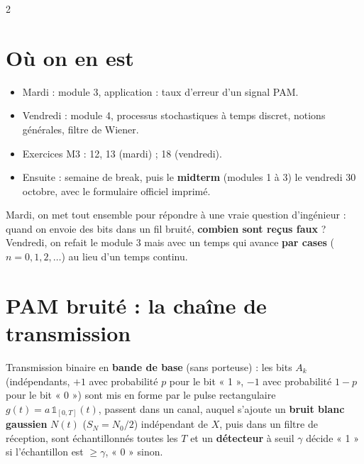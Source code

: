 \documentclass[a4paper,9pt]{extarticle}
\begin{document}

\thispagestyle{fancy}



\begin{multicols}{2}


\section{Où on en est}


\begin{summary}

\begin{itemize}

\item Mardi : module 3, application : taux d'erreur d'un signal PAM.

\item Vendredi : module 4, processus stochastiques à temps discret, notions générales, filtre
de Wiener.

\item Exercices M3 : 12, 13 (mardi) ; 18 (vendredi).

\item Ensuite : semaine de break, puis le \textbf{midterm} (modules 1 à 3) le vendredi 30
octobre, avec le formulaire officiel imprimé.

\end{itemize}

\end{summary}


\begin{simple}

Mardi, on met tout ensemble pour répondre à une vraie question d'ingénieur : quand on envoie
des bits dans un fil bruité, \textbf{combien sont reçus faux} ? Vendredi, on refait le module 3
mais avec un temps qui avance \textbf{par cases} ($n = 0, 1, 2, \dots$) au lieu d'un temps
continu.

\end{simple}


\section{PAM bruité : la chaîne de transmission}


\begin{definition}

Transmission binaire en \textbf{bande de base} (sans porteuse) : les bits $A_k$ (indépendants,
$+1$ avec probabilité $p$ pour le bit « 1 », $-1$ avec probabilité $1-p$ pour le bit « 0 »)
sont mis en forme par le pulse rectangulaire $g(t) = a\,\mathbb 1_{[0,T]}(t)$, passent dans un
canal, auquel s'ajoute un \textbf{bruit blanc gaussien} $N(t)$ ($S_N = N_0/2$) indépendant de
$X$, puis dans un filtre de réception, sont échantillonnés toutes les $T$ et un
\textbf{détecteur} à seuil $\gamma$ décide « 1 » si l'échantillon est $\ge\gamma$, « 0 » sinon.


\end{definition}
\end{multicols}
\end{document}

